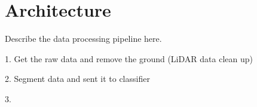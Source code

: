 \section{Architecture}


Describe the data processing pipeline here. 


1. Get the raw data and remove the ground (LiDAR data clean up)

2. Segment data and sent it to classifier 

3. 

